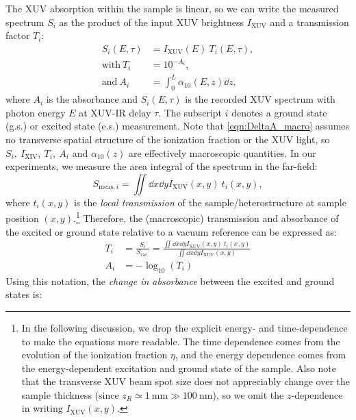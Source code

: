 The XUV absorption within the sample is linear, so we can write the measured spectrum $S_i$ as the product of the input XUV brightness $I_{\textrm{XUV}}$ and a transmission factor $T_i$:
\begin{equation}
\begin{aligned}
S_i(E, \tau) &= I_{\textrm{XUV}}(E) \ T_i(E, \tau), \\
\textrm{with} \ T_i &= 10^{- A_i}, \\
\textrm{and} \ A_i &= \int_{0}^{L} \alpha_{10}(E, z) \dd{z},
\end{aligned}
\label{eqn:DeltaA_macro}
\end{equation}
where $A_i$ is the absorbance and $S_i(E,\tau)$ is the recorded XUV spectrum with photon energy $E$ at XUV-IR delay $\tau$. The subscript $i$ denotes a ground state (g.s.) or excited state (e.s.) measurement. Note that \cref{eqn:DeltaA_macro} assumes no transverse spatial structure of the ionization fraction or the XUV light, so $S_i, \ I_{\textrm{XIV}}, \ T_i, \ A_i$ and $\alpha_{10}(z)$ are effectively macroscopic quantities. In our experiments, we measure the area integral of the spectrum in the far-field:
\begin{equation}
S_{\textrm{meas},i} = \iint \dd{x} \dd{y} I_{\textrm{XUV}}(x,y) \ t_i(x,y),
\end{equation}
where $t_i(x,y)$ is the \textit{local transmission} of the sample/heterostructure at sample position $(x,y)$.\footnote{In the following discussion, we drop the explicit energy- and time-dependence to make the equations more readable. The time dependence comes from the evolution of the ionization fraction $\eta$, and the energy dependence comes from the energy-dependent excitation and ground state of the sample. Also note that the transverse XUV beam spot size does not appreciably change over the sample thickness (since $z_R \simeq 1 \ \textrm{mm} \gg 100 \ \textrm{nm}$), so we omit the $z$-dependence in writing $I_{\textrm{XUV}}(x,y)$.}  Therefore, the (macroscopic) transmission and absorbance of the excited or ground state relative to a vacuum reference can be expressed as:
\begin{equation}
\begin{aligned}
T_i &= \frac{S_i}{S_{\textrm{vac.}}} = \frac{\iint \dd{x} \dd{y} I_{\textrm{XUV}}(x,y) \ t_i(x,y)}{ \iint \dd{x} \dd{y} I_{\textrm{XUV}}(x,y)} \\
A_i &= - \log_{10}(T_i)
\end{aligned}
\end{equation}
Using this notation, the \textit{change in absorbance} between the excited and ground states is:
